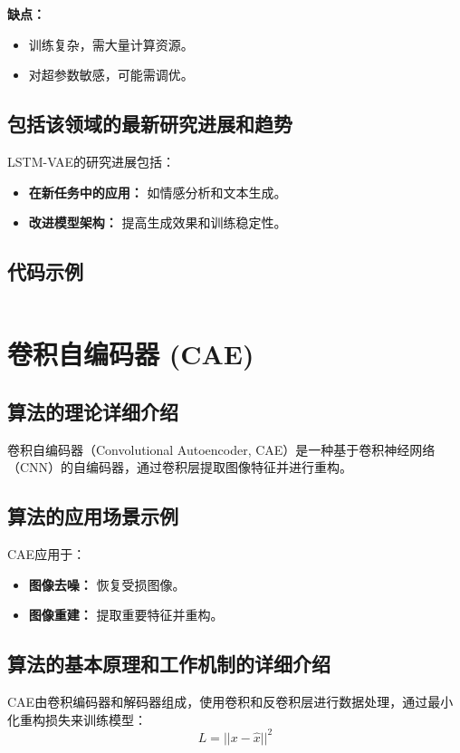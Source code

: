 \textbf{缺点：}
\begin{itemize}
    \item 训练复杂，需大量计算资源。
    \item 对超参数敏感，可能需调优。
\end{itemize}

\subsection*{包括该领域的最新研究进展和趋势}
LSTM-VAE的研究进展包括：
\begin{itemize}
    \item \textbf{在新任务中的应用：} 如情感分析和文本生成。
    \item \textbf{改进模型架构：} 提高生成效果和训练稳定性。
\end{itemize}
\subsection*{代码示例}
\begin{lstlisting}

\end{lstlisting}


\section{卷积自编码器 (CAE)}
\subsection*{算法的理论详细介绍}
卷积自编码器（Convolutional Autoencoder, CAE）是一种基于卷积神经网络（CNN）的自编码器，通过卷积层提取图像特征并进行重构。

\subsection*{算法的应用场景示例}
CAE应用于：
\begin{itemize}
    \item \textbf{图像去噪：} 恢复受损图像。
    \item \textbf{图像重建：} 提取重要特征并重构。
\end{itemize}

\subsection*{算法的基本原理和工作机制的详细介绍}
CAE由卷积编码器和解码器组成，使用卷积和反卷积层进行数据处理，通过最小化重构损失来训练模型：
\[
    L = || x - \hat{x} ||^2
\]

